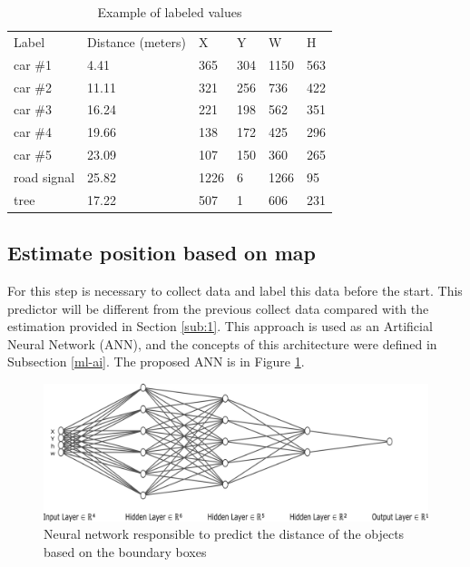 \begin{table}[H]
\centering
\caption{Example of labeled values}
\begin{tabular}{llllll} 
\hline
Label        & Distance (meters) & X    & Y   & W    & H   \\
car \#1         & 4.41     & 365  & 304 & 1150 & 563  \\
car \#2        & 11.11    & 321  & 256 & 736  & 422  \\
car \#3        & 16.24    & 221  & 198 & 562  & 351  \\
car \#4        & 19.66    & 138  & 172 & 425  & 296  \\
car \#5        & 23.09    & 107  & 150 & 360  & 265  \\
road signal & 25.82    & 1226 & 6   & 1266 & 95   \\
tree        & 17.22    & 507  & 1   & 606  & 231  \\
\hline
\end{tabular}
 \label{tab:output_table}
\end{table}



\subsection{Estimate position based on map}

For this step is necessary to collect data and label this data before the start. This predictor will be different from the previous collect data compared with the estimation provided in Section \ref{sub:1}. This approach is used as an Artificial Neural Network (ANN), and the concepts of this architecture were defined in 
Subsection \ref{ml-ai}. The proposed ANN is in Figure \ref{fig:rede_neural}.


\begin{figure}[H]
\centering
\includegraphics[width=\textwidth]{imagens/nn.png}
\caption{Neural network responsible to predict the distance of the objects based on the boundary boxes}
\label{fig:rede_neural}
\end{figure}

